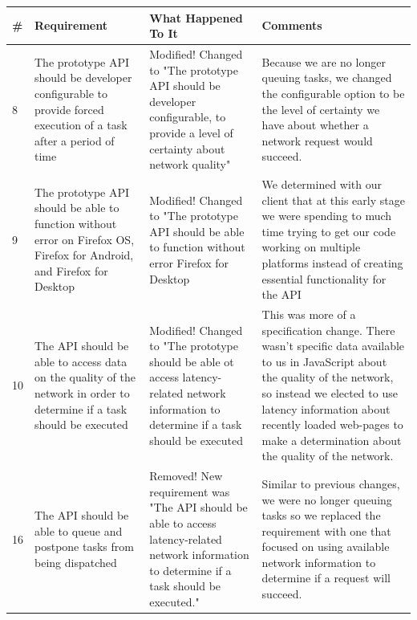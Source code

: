 \documentclass[12pt]{article}
\begin{document}
\begin{tabularx}{\textwidth}{|p{1cm}|X|X|X|}
\hline
\#  & Requirement 				& What Happened To It 		  & Comments \\ \hline
8 & The prototype API should be developer configurable to provide forced execution of a task after a period of time & Modified! Changed to "The prototype API should be developer configurable, to provide a level of certainty about network quality" & Because we are no longer queuing tasks, we changed the configurable option to be the level of certainty we have about whether a network request would succeed. \\ \hline
9 & The prototype API should be able to function without error on Firefox OS, Firefox for Android, and Firefox for Desktop & Modified! Changed to "The prototype API should be able to function without error Firefox for Desktop & We determined with our client that at this early stage we were spending to much time trying to get our code working on multiple platforms instead of creating essential functionality for the API \\ \hline
10 & The API should be able to access data on the quality of the network in order to determine if a task should be executed & Modified! Changed to "The prototype should be able ot access latency-related network information to determine if a task should be executed & This was more of a specification change.  There wasn't specific data available to us in JavaScript about the quality of the network, so instead we elected to use latency information about recently loaded web-pages to make a determination about the quality of the network. \\ \hline
16 & The API should be able to queue and postpone tasks from being dispatched & Removed! New requirement was "The API should be able to access latency-related network information to determine if a task should be executed." & Similar to previous changes, we were no longer queuing tasks so we replaced the requirement with one that focused on using available network information to determine if a request will succeed. \\ \hline
\end{tabularx}
\pagebreak
\end{document}
